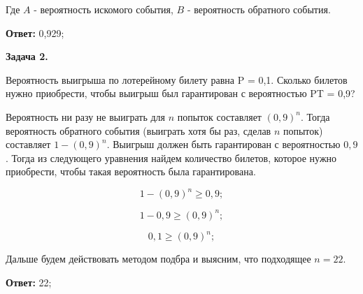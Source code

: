 \documentclass[]{article}
\begin{document}
	Где $A$ - вероятность искомого события, $B$ - вероятность обратного события.
	
	\vspace{10pt}
	
	\textbf{Ответ:} 0,929;
	
	\vspace{30pt}
	
	\centering
	\textbf{Задача 2.}
	
	\vspace{10pt}
	
	\raggedright
	\large
	
	Вероятность выигрыша по лотерейному билету равна P = 0,1. Сколько билетов нужно приобрести, чтобы выигрыш был гарантирован с вероятностью PT = 0,9?
	
	\vspace{20pt}
	
	Вероятность ни разу не выиграть для $n$ попыток составляет $(0,9)^n$. Тогда вероятность обратного события (выиграть хотя бы раз, сделав $n$ попыток) составляет $1 - (0,9)^n$. Выигрыш должен быть гарантирован с вероятностью $0,9$. Тогда из следующего уравнения найдем количество билетов, которое нужно приобрести, чтобы такая вероятность была гарантирована.
	
	\vspace{10pt}
	
	\begin{equation}
	1 - (0,9)^n \geq 0,9;
	\end{equation}
	
	\begin{equation}
	1 - 0,9 \geq (0,9)^n;
	\end{equation}
	
	\begin{equation}
	0,1 \geq (0,9)^n;
	\end{equation}
	
	\vspace{10pt}
	Дальше будем действовать методом подбра и выясним, что подходящее $n = 22.$
	
	\vspace{10pt}
	
	\textbf{Ответ:} 22;
	
	
\end{document}
